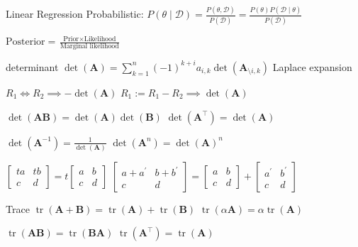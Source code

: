 \documentclass[UTF8,a4paper]{article}
\begin{document}
\begin{multicols}{3}
\begin{cheatsheetblock}{Linear Regression}
    Probabilistic: \hfill $P(\theta \mid \mathscr{D})=\frac{P(\theta, \mathscr{D})}{P(\mathscr{D})}=\frac{P(\theta) P(\mathscr{D} \mid \theta)}{P(\mathscr{D})}$

    \hfill $\text{Posterior} = \frac{\text{Prior} \times \text{Likelihood}}{\text{Marginal likelihood}}$
\end{cheatsheetblock}

\begin{cheatsheetblock}{determinant}
    $\det(\bm{A}) = \sum_{k=1}^{n} (-1)^{k+i} a_{i,k} \det(\bm{A}_{\setminus i,k})$ \hfill Laplace expansion

    $R_1 \Leftrightarrow R_2 \implies -\det(\bm{A})$ \hfill $R_1 := R_1 - R_2 \implies \det(\bm{A})$

    $\det (\bm{A} \bm{B}) = \det (\bm{A}) \det (\bm{B})$ \hfill $\det (\bm{A}^{\top}) = \det (\bm{A})$

    $\det (\bm{A}^{-1}) = \frac{1}{\det (\bm{A})}$ \hfill $\det (\bm{A}^n) = \det (\bm{A})^n$

    $\begin{bmatrix}
            t a & t b \\
            c   & d
        \end{bmatrix}=t\begin{bmatrix}
            a & b \\
            c & d
        \end{bmatrix}$
    \hfill
    $\begin{bmatrix}
            a+a^{\prime} & b+b^{\prime} \\
            c            & d
        \end{bmatrix}=\begin{bmatrix}
            a & b \\
            c & d
        \end{bmatrix}+\begin{bmatrix}
            a^{\prime} & b^{\prime} \\
            c          & d
        \end{bmatrix}$
\end{cheatsheetblock}

\begin{cheatsheetblock}{Trace}
    $\operatorname{tr}(\bm{A}+\bm{B})=\operatorname{tr}(\bm{A})+\operatorname{tr}(\bm{B})$ \hfill $\operatorname{tr}(\alpha \bm{A})=\alpha \operatorname{tr}(\bm{A})$

    $\operatorname{tr}(\bm{A} \bm{B})=\operatorname{tr}(\bm{B} \bm{A})$ \hfill $\operatorname{tr}(\bm{A}^{\top})=\operatorname{tr}(\bm{A})$
\end{cheatsheetblock}


\end{multicols}
\end{document}
